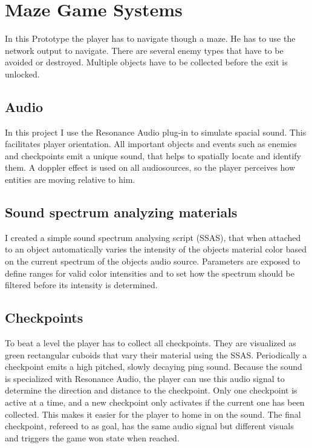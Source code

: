 
\chapter{Maze Game Systems}\label{MazeGameSystems}
 In this Prototype the player has to navigate though a maze. He has to use the network output to navigate. There are several enemy types that have to be avoided or destroyed. Multiple objects have to be collected before the exit is unlocked.

\section{Audio}
In this project I use the Resonance Audio plug-in to simulate spacial sound. This facilitates player orientation. All important objects and events such as enemies and checkpoints emit a unique sound, that helps to spatially locate and identify them. A doppler effect is used on all audiosources, so the player perceives how entities are moving relative to him.



\section{Sound spectrum analyzing materials}
I created a simple sound spectrum analysing script (SSAS), that when attached to an object automatically varies the intensity of the objects material color based on the current spectrum of the objects audio source. Parameters are exposed to define ranges for valid color intensities and to set how the spectrum should be filtered before its intensity is determined.



\section{Checkpoints}
To beat a level the player has to collect all checkpoints. They are visualized as green rectangular cuboids that vary their material using the SSAS. Periodically a checkpoint emits a high pitched, slowly decaying ping sound. Because the sound is specialized with Resonance Audio, the player can use this audio signal to determine the direction and distance to the checkpoint. Only one checkpoint is active at a time, and a new checkpoint only activates if the current one has been collected. This makes it easier for the player to home in on the sound. The final checkpoint, refereed to as goal, has the same audio signal but different visuals and triggers the game won state when reached.


